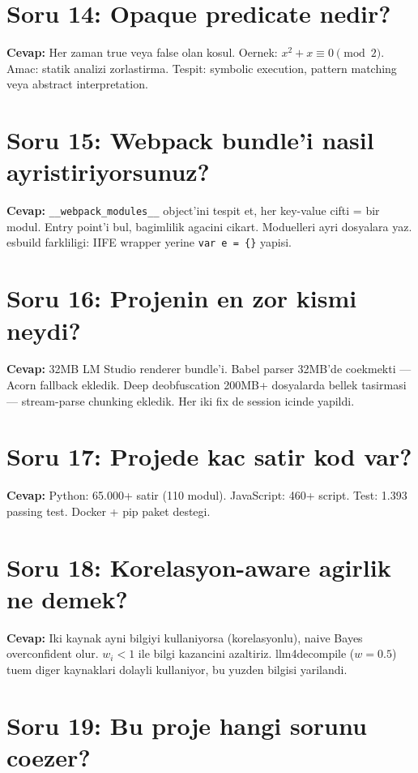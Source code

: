 \documentclass[12pt,a4paper,oneside]{book}
\theoremstyle{definition}
\newcommand{\code}[1]{\texttt{\color{green!60!white}#1}}
\begin{document}
\section{Soru 14: Opaque predicate nedir?}

\textbf{Cevap:} Her zaman true veya false olan kosul. Oernek: $x^2 + x \equiv 0 \pmod{2}$. Amac: statik analizi zorlas\-tirma. Tespit: symbolic execution, pattern matching veya abstract interpretation.

\section{Soru 15: Webpack bundle'i nasil ayristi\-riyorsunuz?}

\textbf{Cevap:} \code{\_\_webpack\_modules\_\_} object'ini tespit et, her key-value cifti = bir modul. Entry point'i bul, bagimlili\-k agacini cikart. Moduelleri ayri dosyalara yaz. esbuild farkliligi: IIFE wrapper yerine \code{var e = \{\}} yapisi.

\section{Soru 16: Projenin en zor kismi neydi?}

\textbf{Cevap:} 32MB LM Studio renderer bundle'i. Babel parser 32MB'de coekmekti --- Acorn fallback ekledik. Deep deobfuscation 200MB+ dosyalarda bellek tasirmasi --- stream-parse chunking ekledik. Her iki fix de session icinde yapildi.

\section{Soru 17: Projede kac satir kod var?}

\textbf{Cevap:} Python: 65.000+ satir (110 modul). JavaScript: 460+ script. Test: 1.393 passing test. Docker + pip paket destegi.

\section{Soru 18: Korelasyon-aware agirlik ne demek?}

\textbf{Cevap:} Iki kaynak ayni bilgiyi kullaniyorsa (korelasyonlu), naive Bayes overconfident olur. $w_i < 1$ ile bilgi kazancini azaltiriz. llm4decompile ($w=0.5$) tuem diger kaynaklari dolayli kullaniyor, bu yuzden bilgisi yarilandi.

\section{Soru 19: Bu proje hangi sorunu coezer?}
\end{document}
